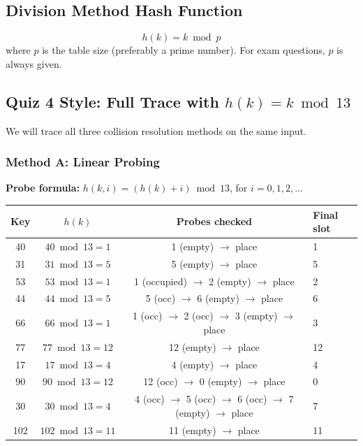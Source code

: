 \documentclass[12pt,portrait]{article}
\begin{document}
\subsection{Division Method Hash Function}
$$h(k) = k \bmod p$$
where $p$ is the table size (preferably a prime number). For exam questions, $p$ is always given.

\subsection{Quiz 4 Style: Full Trace with $h(k)=k\bmod 13$}

\begin{rulebox}[Insert Elements: 40, 31, 53, 44, 66, 77, 17, 90, 30, 102 into table of size $m=13$]
We will trace all three collision resolution methods on the same input.
\end{rulebox}

\subsubsection{Method A: Linear Probing}

\textbf{Probe formula:} $h(k, i) = (h(k) + i) \bmod 13$, for $i = 0, 1, 2, \ldots$

\begin{center}
\begin{tabular}{c|c|c|l}
\toprule
\textbf{Key} & $h(k)$ & \textbf{Probes checked} & \textbf{Final slot} \\
\midrule
40 & $40\bmod13 = 1$ & 1 (empty) $\to$ place & 1 \\
31 & $31\bmod13 = 5$ & 5 (empty) $\to$ place & 5 \\
53 & $53\bmod13 = 1$ & 1 (occupied) $\to$ 2 (empty) $\to$ place & 2 \\
44 & $44\bmod13 = 5$ & 5 (occ) $\to$ 6 (empty) $\to$ place & 6 \\
66 & $66\bmod13 = 1$ & 1 (occ) $\to$ 2 (occ) $\to$ 3 (empty) $\to$ place & 3 \\
77 & $77\bmod13 = 12$ & 12 (empty) $\to$ place & 12 \\
17 & $17\bmod13 = 4$ & 4 (empty) $\to$ place & 4 \\
90 & $90\bmod13 = 12$ & 12 (occ) $\to$ 0 (empty) $\to$ place & 0 \\
30 & $30\bmod13 = 4$ & 4 (occ) $\to$ 5 (occ) $\to$ 6 (occ) $\to$ 7 (empty) $\to$ place & 7 \\
102 & $102\bmod13 = 11$ & 11 (empty) $\to$ place & 11 \\
\bottomrule
\end{tabular}
\end{center}
\end{document}
